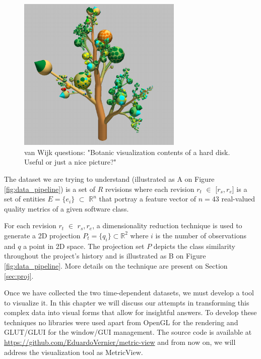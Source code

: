 \begin{figure}[h]
	\centering
	\includegraphics[width=0.7\textwidth]{figures/botanic.png}
	\caption {van Wijk questions: "Botanic visualization contents of a hard disk. Useful or just a nice picture?"}
	\label{fig:botanic}
\end{figure}

The dataset we are trying to understand (illustrated as A on Figure \ref{fig:data_pipeline}) is a set of $R$ revisions where each revision $r_{t}$ $\in$ [$r_{s}, r_{e}$] \hspace{0.2cm}is a set of entities $E = \{ e_{i}\}$ $\subset$ $\mathbb{R}^{n}$ that portray a feature vector of $n = 43$ real-valued quality metrics of a given software class.

For each revision $r_{t}$ $\in$ \lbrack  $r_{s}, r_{e}$\rbrack, a dimensionality reduction technique is used to generate a 2D projection $P_{t} = \{q_{i} \} \subset{\mathbb{R}^{2}}$ where $i$ is the number of observations and $q$ a point in 2D space. The projection set $P$ depicts the class similarity throughout the project's history and is illustrated as B on Figure \ref{fig:data_pipeline}. More details on the technique are present on Section \ref{sec:proj}.

Once we have collected the two time-dependent datasets, we must develop a tool to visualize it. In this chapter we will discuss our attempts in transforming this complex data into visual forms that allow for insightful answers. To develop these techniques no libraries were used apart from OpenGL for the rendering and GLUT/GLUI for the window/GUI management. The source code is available at \url{https://github.com/EduardoVernier/metric-view} and from now on, we will address the visualization tool as MetricView.
